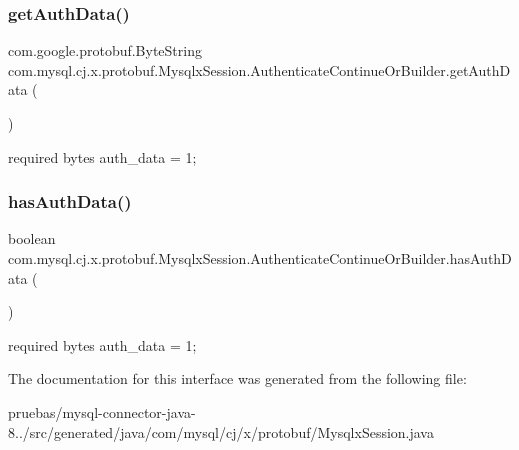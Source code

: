 \subsubsection{\texorpdfstring{get\+Auth\+Data()}{getAuthData()}}
{\footnotesize\ttfamily com.\+google.\+protobuf.\+Byte\+String com.\+mysql.\+cj.\+x.\+protobuf.\+Mysqlx\+Session.\+Authenticate\+Continue\+Or\+Builder.\+get\+Auth\+Data (\begin{DoxyParamCaption}{ }\end{DoxyParamCaption})}

{\ttfamily required bytes auth\+\_\+data = 1;} \mbox{\label{interfacecom_1_1mysql_1_1cj_1_1x_1_1protobuf_1_1_mysqlx_session_1_1_authenticate_continue_or_builder_a971d3adc955797742de2724eb0391d18}} 
\subsubsection{\texorpdfstring{has\+Auth\+Data()}{hasAuthData()}}
{\footnotesize\ttfamily boolean com.\+mysql.\+cj.\+x.\+protobuf.\+Mysqlx\+Session.\+Authenticate\+Continue\+Or\+Builder.\+has\+Auth\+Data (\begin{DoxyParamCaption}{ }\end{DoxyParamCaption})}

{\ttfamily required bytes auth\+\_\+data = 1;} 

The documentation for this interface was generated from the following file\+:\begin{DoxyCompactItemize}
\item 
pruebas/mysql-\/connector-\/java-\/8../src/generated/java/com/mysql/cj/x/protobuf/Mysqlx\+Session.\+java\end{DoxyCompactItemize}
